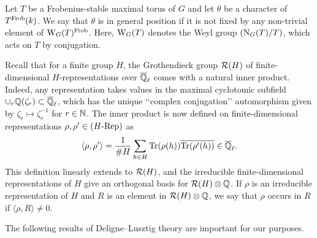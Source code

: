 \documentclass[../main.tex]{subfiles}
\begin{document}
\begin{defi}\label{def:DLGeomConjRegularPos}
  Let $T$ be a Frobenius-stable maximal  torus of $G$ and let $\theta$ be a character of $T^{\mathrm{Frob}}(k)$. We say that $\theta$ is in general position if it is not fixed by any
  non-trivial element of $\mathrm W_G(T)^{\mathrm{Frob}}$. Here, $\mathrm W_G(T)$ denotes the Weyl group $(\operatorname{N}_G(T)/T)$, which acts on $T$ by conjugation.
\end{defi}

Recall that for a finite group $H$, the Grothendieck group $\mathcal{R}(H)$ of finite-dimensional $H$-representations over $\overline {\mathbb{Q}}_\ell$ comes with a natural inner
product. Indeed, any representation takes values in the maximal cyclotomic
subfield $\cup_{r} \mathbb{Q}(\zeta_r) \subset \overline {\mathbb{Q}}_\ell$, which has the unique 
‘‘complex conjugation’’ automorphism given by $\zeta_r \mapsto \zeta_r^{-1}$ for 
$r \in \mathbb{N}$. 
The inner product is now defined on finite-dimensional representations $\rho,
\rho' \in {({H}\textnormal-\allowbreak\mathrm{Rep})}$ as
\begin{equation*}
  \langle \rho, \rho' \rangle = \frac 1 {\# H} \sum_{h \in H} \operatorname{Tr}(\rho(h)) \overline {\operatorname{Tr} (\rho'(h))} \in \overline {\mathbb{Q}}_\ell.
\end{equation*}
This definition linearly extends to $\mathcal{R}(H)$, and the irreducible
finite-dimensional representations of $H$ give an orthogonal basis for $\mathcal{R}(H)
\otimes \mathbb{Q}$. If $\rho$ is an irreducible representation of $H$ and 
$R$ is an element in $\mathcal{R}(H) \otimes \mathbb{Q}$, we say that $\rho$ occurs in $R$ if 
$\langle \rho, R\rangle \neq 0$.

The following results of Deligne--Lusztig theory are important for our purposes.
\end{document}
